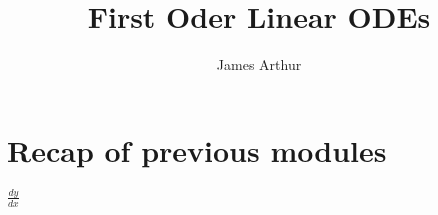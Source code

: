 \documentclass{article}
\title{First Oder Linear ODEs}
\author{James Arthur}
\begin{document}
\maketitle
\tableofcontents\newpage



\section{Recap of previous modules}

$\frac{dy}{dx}$
\end{document}
